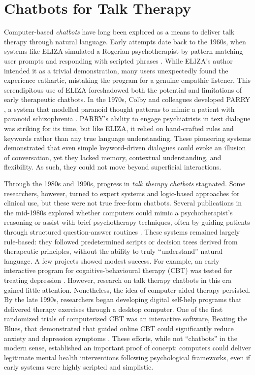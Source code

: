 \section{Chatbots for Talk Therapy}
Computer-based \emph{chatbots} have long been explored as a means to deliver talk
therapy through natural language. Early attempts date back to the 1960s, when systems
like ELIZA simulated a Rogerian psychotherapist by pattern-matching user prompts and
responding with scripted phrases \cite{Weizenbaum1966}. While ELIZA's author intended
it as a trivial demonstration, many users unexpectedly found the experience cathartic,
mistaking the program for a genuine empathic listener. This serendipitous use of ELIZA
foreshadowed both the potential and limitations of early therapeutic chatbots. In the
1970s, Colby and colleagues developed PARRY \cite{10.5555/212154.212175}, a system that
modelled paranoid thought patterns to mimic a patient with paranoid schizophrenia
\cite{Colby1971}. PARRY's ability to engage psychiatrists in text dialogue was striking
for its time, but like ELIZA, it relied on hand-crafted rules and keywords rather than
any true language understanding. These pioneering systems demonstrated that even simple
keyword-driven dialogues could evoke an illusion of conversation, yet they lacked
memory, contextual understanding, and flexibility. As such, they could not move beyond
superficial interactions.

Through the 1980s and 1990s, progress in \emph{talk therapy chatbots} stagnated. Some
researchers, however, turned to expert systems and logic-based approaches for clinical
use, but these were not true free-form chatbots. Several publications in the mid-1980s
explored whether computers could mimic a psychotherapist's reasoning or assist with
brief psychotherapy techniques, often by guiding patients through structured
question-answer routines \cite{Hartman1986,Sampson1986,ServanSchreiber1986}. These
systems remained largely rule-based: they followed predetermined scripts or decision
trees derived from therapeutic principles, without the ability to truly ``understand''
natural language. A few projects showed modest success. For example, an early
interactive program for cognitive-behavioural therapy (CBT) was tested for treating
depression \cite{Selmi1990}. However, research on talk therapy chatbots in this era
gained little attention. Nonetheless, the idea of computer-aided therapy persisted. By
the late 1990s, researchers began developing digital self-help programs that delivered
therapy exercises through a desktop computer. One of the first randomized trials of
computerized CBT was an interactive software, Beating the Blues, that demonstrated that
guided online CBT could significantly reduce anxiety and depression symptoms
\cite{Proudfoot2003}. These efforts, while not ``chatbots'' in the modern sense,
established an important proof of concept: computers could deliver legitimate mental
health interventions following psychological frameworks, even if early systems were
highly scripted and simplistic.

